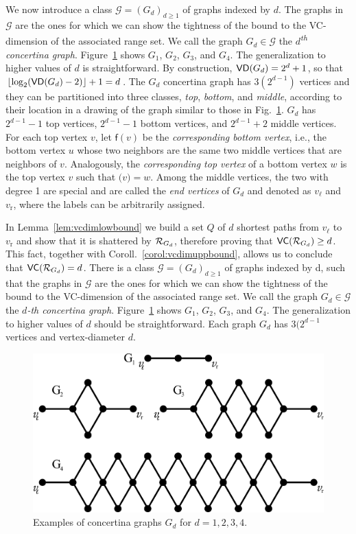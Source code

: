 \ifproof
We now introduce a class $\mathcal{G}=(G_d)_{d\ge 1}$ of graphs indexed by $d$.
The graphs in $\mathcal{G}$ are the ones for which we can show the tightness of
the bound to the VC-dimension of the associated range set.
We call the graph $G_d\in\mathcal{G}$ the \emph{$d$\textsuperscript{th} concertina graph}.
Figure~\ref{fig:tightgraphs} shows $G_1$, $G_2$, $G_3$, and $G_4$. The
generalization to higher values of $d$ is straightforward.
By construction, $\mathsf{VD}(G_d)=2^d+1$, so that
$\lfloor\log_2(\mathsf{VD}(G_d)-2)\rfloor+1=d$. The $G_d$ concertina graph has 
$3(2^{d-1})$ vertices and they can be partitioned into three classes,
\emph{top}, \emph{bottom}, and \emph{middle},
according to their location in a drawing of the graph similar to those in
Fig.~\ref{fig:tightgraphs}. $G_d$ has $2^{d-1}-1$ top vertices, $2^{d-1}-1$
bottom vertices, and $2^{d-1}+2$ middle vertices. For each top vertex $v$, let
$\mathsf{f}(v)$ be the \emph{corresponding bottom vertex}, i.e., the bottom
vertex $u$ whose two neighbors are the same two middle vertices that are
neighbors of $v$. Analogously, the \emph{corresponding top vertex} of a bottom
vertex $w$ is the top vertex $v$ such that $\mathsf(v)=w$. Among the middle
vertices, the two with degree 1 are special and are called the \emph{end
vertices} of $G_d$ and denoted as $v_\ell$ and $v_\mathrm{r}$, where the labels
can be arbitrarily assigned. 

In Lemma~\ref{lem:vcdimlowbound} we build a set $Q$ of $d$ shortest paths from
$v_\ell$ to $v_\mathrm{r}$ and show that it is shattered by $\mathcal{R}_{G_d}$,
therefore proving that $\mathsf{VC}(\mathcal{R}_{G_d})\ge d$. This fact, together with
Coroll.~\ref{corol:vcdimuppbound}, allows us to conclude that $\mathsf{VC}(\mathcal{R}_{G_d})=d$. 
\else
There is a class $\mathcal{G}=(G_d)_{d\ge 1}$ of graphs indexed by d, such that
the graphs in $\mathcal{G}$ are the ones for which we can show the tightness of
the bound to the VC-dimension of the associated range set. We call the graph
$G_d\in\mathcal{G}$ the \emph{$d$-th concertina graph}.
Figure~\ref{fig:tightgraphs} shows $G_1$, $G_2$, $G_3$, and $G_4$. The
generalization to higher values of $d$ should be straightforward. Each graph
$G_d$ has $3(2^{d-1}$ vertices and vertex-diameter $d$.

\fi

\begin{figure}[th]
  \centering
  \includegraphics[scale=0.3]{figures_dmkd/eps/tight}
  \caption{Examples of concertina graphs $G_d$ for $d=1,2,3,4$.}
  \label{fig:tightgraphs}
\end{figure}

